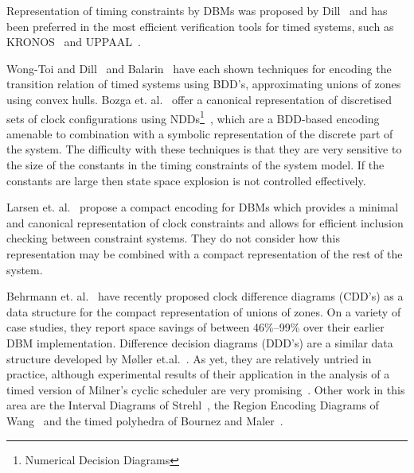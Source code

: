 Representation of timing constraints by DBMs was proposed by Dill~\cite{dil:89}
and has been preferred in the most efficient verification tools for
timed systems, such as KRONOS~\cite{hnsy:94} and UPPAAL~\cite{lpy:97}.
 
Wong-Toi and Dill~\cite{wd:94} and Balarin~\cite{bal:96} have each
shown techniques for encoding the transition relation of timed systems
using BDD's, approximating unions of zones using convex hulls. Bozga
et. al.~\cite{bmp:97} offer a canonical representation of discretised
sets of clock configurations using NDDs\footnote{Numerical Decision
Diagrams}~\cite{abk:97}, which are a BDD-based encoding amenable to
combination with a symbolic representation of the discrete part of the
system. The difficulty with these techniques is that they are very 
sensitive to the size of the constants in the timing constraints of the
system model. If the constants are large then state space explosion is not
controlled effectively.

Larsen et. al.~\cite{llp:97} propose a compact encoding for DBMs which
provides a minimal and canonical representation of clock constraints and
allows for efficient inclusion checking between constraint systems. They
do not consider how this representation may be combined with a compact
representation of the rest of the system.

Behrmann et. al.~\cite{blp:99} have recently proposed clock difference
diagrams (CDD's) as a data structure for the compact representation of
unions of zones. On a variety of case studies, they report space
savings of between 46\%--99\% over their earlier DBM
implementation. Difference decision diagrams (DDD's) are a similar
data structure developed by M\o ller et.al.~\cite{ml:98}. As yet, they
are relatively untried in practice, although experimental results of
their application in the analysis of a timed version of Milner's
cyclic scheduler are very promising~\cite{mla:99}. Other work in this
area are the Interval Diagrams of Strehl~\cite{str:99}, the Region
Encoding Diagrams of Wang~\cite{wan:00} and the timed polyhedra of
Bournez and Maler~\cite{bm:00}.
  
